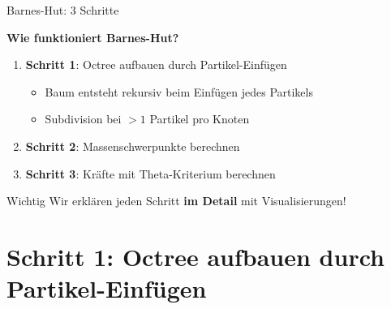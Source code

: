 \documentclass[xcolor=dvipsnames]{beamer}
\begin{document}
\begin{frame}{Barnes-Hut: 3 Schritte}
\begin{center}
\large
\textbf{Wie funktioniert Barnes-Hut?}
\end{center}

\begin{enumerate}
    \item \textbf{Schritt 1}: Octree aufbauen durch Partikel-Einfügen
    \begin{itemize}
        \item Baum entsteht rekursiv beim Einfügen jedes Partikels
        \item Subdivision bei $>1$ Partikel pro Knoten
    \end{itemize}
    \item \textbf{Schritt 2}: Massenschwerpunkte berechnen
    \item \textbf{Schritt 3}: Kräfte mit Theta-Kriterium berechnen
\end{enumerate}

\vspace{0.5cm}
\begin{alertblock}{Wichtig}
Wir erklären jeden Schritt \textbf{im Detail} mit Visualisierungen!
\end{alertblock}
\end{frame}

\section{Schritt 1: Octree aufbauen durch Partikel-Einfügen}
\end{document}
